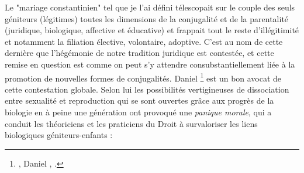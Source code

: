  Le "mariage constantinien" tel que je l'ai défini télescopait sur le couple des seuls géniteurs (légitimes) toutes les dimensions de la conjugalité et de la parentalité (juridique, biologique, affective et éducative) et frappait tout le reste d'illégitimité et notamment la filiation élective, volontaire, adoptive. C'est au nom de cette dernière que l'hégémonie de notre tradition juridique est contestée, et cette remise en question est comme on peut s'y attendre consubstantiellement liée à la promotion de nouvelles formes de conjugalités. Daniel 
\footnote{\href{http://www.universalis.fr/encyclopedie/famille-les-enjeux-de-la-parentalite/}{}, Daniel , .} est un bon avocat de cette contestation globale. Selon lui les possibilités vertigineuses de dissociation entre sexualité et reproduction qui se sont ouvertes grâce aux progrès de la biologie en à peine une génération ont provoqué une\emph{ panique morale}, qui a conduit les théoriciens et les praticiens du Droit à survaloriser les liens biologiques géniteurs-enfants : 

